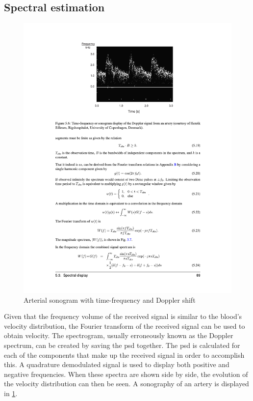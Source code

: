 \subsection{Spectral estimation}
\begin{figure}[htbp]
	\centering
	\includegraphics[width=.8\textwidth]{Figures/2_estimation_sonogram_cph.pdf}
	\caption[Arterial sonogram with time-frequency and Doppler shift]{Arterial sonogram with time-frequency and Doppler shift \cite{JensenUltrasoundBook}}
	\label{fig:2_estimation_sonogram_cph}
\end{figure}

Given that the frequency volume of the received signal is similar to the blood's velocity distribution, the Fourier transform of the received signal can be used to obtain velocity. The spectrogram, usually erroneously known as the Doppler spectrum, can be created by saving the \gls{psd} together. The \gls{psd} is calculated for each of the components that make up the received signal in order to accomplish this. A quadrature demodulated signal is used to display both positive and negative frequencies. When these spectra are shown side by side, the evolution of the velocity distribution can then be seen. A sonography of an artery is displayed in \cref{fig:2_estimation_sonogram_cph}.
